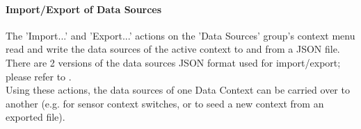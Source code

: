 \paragraph{Import/Export of Data Sources}
\label{sec:config_ds_export}

The 'Import...' and 'Export...' actions on the 'Data Sources' group's context menu read and write the data sources of the active context to and from a JSON file. There are 2 versions of the data sources JSON format used for import/export; please refer to . \\

Using these actions, the data sources of one Data Context can be carried over to another (e.g. for sensor context switches, or to seed a new context from an exported file).
